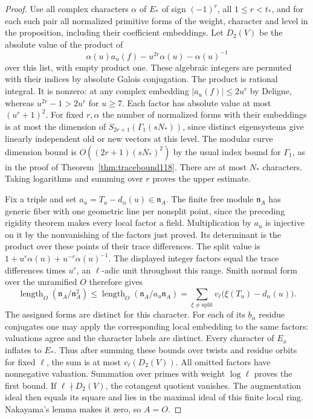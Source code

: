 \documentclass[a4paper,11pt]{article}
\theoremstyle{definition}
\theoremstyle{remark}
\numberwithin{equation}{section}
\begin{document}
\begin{proof}
Use all complex characters \(\alpha\) of \(E_*\) of sign
\((-1)^r\), all \(1\le r<t_*\), and for each such pair all
normalized primitive forms of the weight, character and level
in the proposition, including their coefficient embeddings.
Let \(D_2(V)\) be the absolute value of the product of
\[
     \alpha(u)a_u(f)-u^{2r}\alpha(u)-\alpha(u)^{-1}
\]
over this list, with empty product one. These algebraic
integers are permuted with their indices by absolute
Galois conjugation. The product is rational integral.
It is nonzero: at any complex embedding \(|a_u(f)|\le2u^r\)
by Deligne, whereas \(u^{2r}-1>2u^r\) for \(u\ge7\).
Each factor has absolute value at most \((u^r+1)^2\).
For fixed \(r,\alpha\) the number of normalized forms with
their embeddings is at most the dimension of
\(S_{2r+1}(\Gamma_1(sN_*))\), since distinct eigensystems
give linearly independent old or new vectors at this level.
The modular curve dimension bound is \(O((2r+1)(sN_*)^2)\)
by the usual index bound for \(\Gamma_1\), as in the proof
of Theorem~\ref{thm:tracebound118}. There are at most
\(N_*\) characters. Taking logarithms and summing over
\(r\) proves the upper estimate.~\cite{VIII-VI-VI-deligne40}

Fix a triple and set \(a_u=T_u-d_\alpha(u)\in\mathfrak n_A\).
The finite free module \(\mathfrak n_A\) has generic fiber
with one geometric line per nonsplit point, since the
preceding rigidity theorem makes every local factor a field.
Multiplication by \(a_u\) is injective on it by the nonvanishing
of the factors just proved. Its determinant is the product
over these points of their trace differences. The split
value is \(1+u^r\alpha(u)+u^{-r}\alpha(u)^{-1}\).
The displayed integer factors equal the trace differences
times \(u^r\), an \(\ell\)-adic unit throughout this range.
Smith normal form over the unramified \(O\) therefore gives
\[
 \operatorname{length}_O(\mathfrak n_A/\mathfrak n_A^2)
 \le \operatorname{length}_O(\mathfrak n_A/a_u\mathfrak n_A)
 =\sum_{\xi\ne\mathrm{split}}
      v_\ell\bigl(\xi(T_u)-d_\alpha(u)\bigr).
\]
The assigned forms are distinct for this character. For
each of its \(b_\alpha\) residue conjugates one may apply
the corresponding local embedding to the same factors:
valuations agree and the character labels are distinct.
Every character of \(E_x\) inflates to \(E_*\). Thus after
summing these bounds over twists and residue orbits for
fixed \(\ell\), the sum is at most \(v_\ell(D_2(V))\).
All omitted factors have nonnegative valuation. Summation
over primes with weight \(\log\ell\) proves the first bound.
If \(\ell\nmid D_2(V)\), the cotangent quotient vanishes.
The augmentation ideal then equals its square and lies in
the maximal ideal of this finite local ring. Nakayama's
lemma makes it zero, so \(A=O\).


\end{proof}
\end{document}
